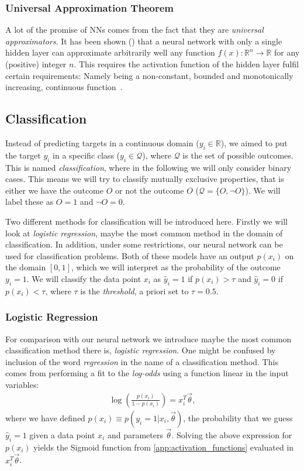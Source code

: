     \subsubsection{Universal Approximation Theorem}
        A lot of the promise of NNs comes from the fact that they are \textit{universal approximators}. It has been shown (\citep{HornikEtAl89}) that a neural network with only a single hidden layer can approximate arbitrarily well any function $f(x): \mathbb{R}^n \to \mathbb{R}$ for any (positive) integer $n$. This requires the activation function of the hidden layer fulfil certain requirements: Namely being a non-constant, bounded and monotonically increasing, continuous function~\citep{MortenUAT}.



\subsection{Classification}
    Instead of predicting targets in a continuous domain ($y_i \in \mathbb{R}$), we aimed to put the target $y_i$ in a specific class ($y_i \in \mathcal{Q}$), where $\mathcal{Q}$ is the set of possible outcomes. This is named \textit{classification}, where in the following we will only consider binary cases. This means we will try to classify mutually exclusive properties, that is either we have the outcome $O$ or not the outcome $O$ ($\mathcal{Q} = \{O, \neg O\}$). We will label these as $O = 1$ and $\neg O = 0$.

    Two different methods for classification will be introduced here. Firstly we will look at \textit{logistic regression}, maybe the most common method in the domain of classification. In addition, under some restrictions, our neural network can be used for classification problems. Both of these models have an output $p(x_i)$ on the domain $[0,1]$, which we will interpret as the probability of the outcome $y_i = 1$. We will classify the data point $x_i$ as $\hat{y}_i = 1$ if $p(x_i) > \tau$ and $\hat{y}_i = 0$ if $p(x_i) < \tau$, where $\tau$ is the \textit{threshold}, a priori set to $\tau = 0.5$. 

    \subsubsection{Logistic Regression}
        For comparison with our neural network we introduce maybe the most common classification method there is, \textit{logistic regression}. One might be confused by inclusion of the word \textit{regression} in the name of a classification method. This comes from performing a fit to the \textit{log-odds} using a function linear in the input variables:
        \begin{align*}
            \log(\frac{p(x_i)}{1-p(x_i)}) = x_i^T \vec{\theta},
        \end{align*}
        where we have defined $p(x_i) \equiv p(y_i = 1 | x_i, \vec{\theta})$, the probability that we guess $\hat{y}_i = 1$ given a data point $x_i$ and parameters $\vec{\theta}$. Solving the above expression for $p(x_i)$ yields the Sigmoid function from \cref{app:activation_functions} evaluated in $x_i^T \vec{\theta}$.
    
